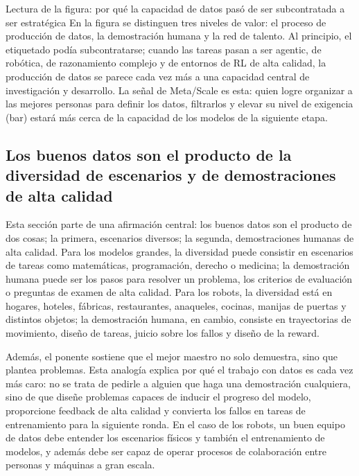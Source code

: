 \documentclass[a4paper]{article}
\begin{document}
\begin{knowledgebox}{Lectura de la figura: por qué la capacidad de datos pasó de ser subcontratada a ser estratégica}
En la figura se distinguen tres niveles de valor: el proceso de producción de datos, la demostración humana y la red de talento. Al principio, el etiquetado podía subcontratarse; cuando las tareas pasan a ser agentic, de robótica, de razonamiento complejo y de entornos de RL de alta calidad, la producción de datos se parece cada vez más a una capacidad central de investigación y desarrollo. La señal de Meta/Scale es esta: quien logre organizar a las mejores personas para definir los datos, filtrarlos y elevar su nivel de exigencia (bar) estará más cerca de la capacidad de los modelos de la siguiente etapa.
\end{knowledgebox}

\subsection{Los buenos datos son el producto de la diversidad de escenarios y de demostraciones de alta calidad}

Esta sección parte de una afirmación central: los buenos datos son el producto de dos cosas; la primera, escenarios diversos; la segunda, demostraciones humanas de alta calidad. Para los modelos grandes, la diversidad puede consistir en escenarios de tareas como matemáticas, programación, derecho o medicina; la demostración humana puede ser los pasos para resolver un problema, los criterios de evaluación o preguntas de examen de alta calidad. Para los robots, la diversidad está en hogares, hoteles, fábricas, restaurantes, anaqueles, cocinas, manijas de puertas y distintos objetos; la demostración humana, en cambio, consiste en trayectorias de movimiento, diseño de tareas, juicio sobre los fallos y diseño de la reward.

Además, el ponente sostiene que el mejor maestro no solo demuestra, sino que plantea problemas. Esta analogía explica por qué el trabajo con datos es cada vez más caro: no se trata de pedirle a alguien que haga una demostración cualquiera, sino de que diseñe problemas capaces de inducir el progreso del modelo, proporcione feedback de alta calidad y convierta los fallos en tareas de entrenamiento para la siguiente ronda. En el caso de los robots, un buen equipo de datos debe entender los escenarios físicos y también el entrenamiento de modelos, y además debe ser capaz de operar procesos de colaboración entre personas y máquinas a gran escala.
\end{document}
